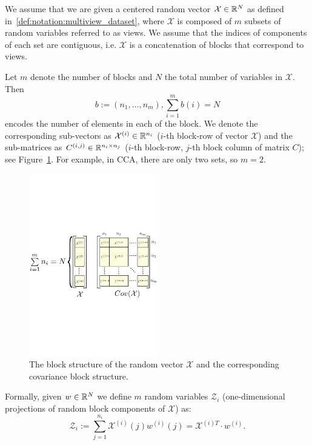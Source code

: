 We assume that we are given a centered random vector $\mathcal{X} \in \mathbb{R}^N$ as defined in~\ref{def:notation:multiview_dataset},
where $\mathcal{X}$ is composed of $m$ subsets of random variables referred to as views. We assume that the indices of components
of each set are contiguous, i.e. $\mathcal{X}$ is a concatenation of blocks that correspond to views.

Let $m$ denote the number of blocks and $N$ the total number of
variables in $\mathcal{X}$. Then
$$b := \left(n_1, \ldots, n_m\right), \sum_{i=1}^m b\left(i\right) = N$$
encodes the number of elements in each of the block. We denote the corresponding
sub-vectors as $\mathcal{X}^{(i)} \in \mathbb{R}^{n_i}$
($i$-th block-row of vector $\mathcal{X}$) and the sub-matrices as $C^{(i,j)} \in \mathbb{R}^{n_i \times n_j}$ ($i$-th block-row, $j$-th block column of matrix $C$); see Figure~\ref{fig:block_structure}. For example, in CCA, there are only two sets, so $m=2$.
\begin{figure}[t]
\centering
\includegraphics[width=0.5\textwidth]{figures/block_structure.pdf}
\caption{\label{fig:block_structure} The block structure of the  random vector $\mathcal{X}$ and the corresponding covariance block structure.}
\end{figure}

Formally, given $w \in \mathbb{R}^N$ we define $m$ random variables $\mathcal{Z}_i$ (one-dimensional projections of random block components of $\mathcal{X}$) as:
\begin{equation*}
\mathcal{Z}_i := \sum_{j = 1}^{n_i} \mathcal{X}^{(i)}\left(j\right)
w^{(i)}\left(j\right) = \mathcal{X}^{(i)T} \cdot w^{(i)}.
\end{equation*}

